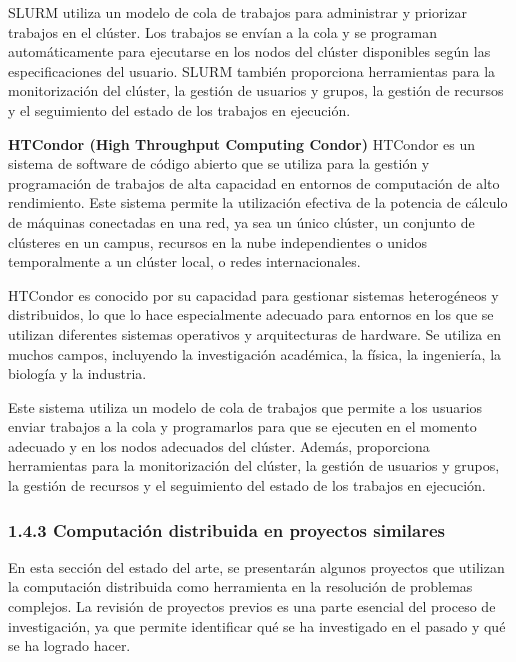 \begin{doublespace}
\begin{multicols}{2}
  SLURM utiliza un modelo de cola de trabajos para administrar y priorizar trabajos en el clúster. Los trabajos se envían a la cola y se programan automáticamente para ejecutarse en los nodos del clúster disponibles según las especificaciones del usuario. SLURM también proporciona herramientas para la monitorización del clúster, la gestión de usuarios y grupos, la gestión de recursos y el seguimiento del estado de los trabajos en ejecución.
  \vspace{3mm}

  \textbf{HTCondor (High Throughput Computing Condor)}
  \newline
  HTCondor es un sistema de software de código abierto que se utiliza para la gestión y programación de trabajos de alta capacidad en entornos de computación de alto rendimiento. Este sistema permite la utilización efectiva de la potencia de cálculo de máquinas conectadas en una red, ya sea un único clúster, un conjunto de clústeres en un campus, recursos en la nube independientes o unidos temporalmente a un clúster local, o redes internacionales.

  HTCondor es conocido por su capacidad para gestionar sistemas heterogéneos y distribuidos, lo que lo hace especialmente adecuado para entornos en los que se utilizan diferentes sistemas operativos y arquitecturas de hardware. Se utiliza en muchos campos, incluyendo la investigación académica, la física, la ingeniería, la biología y la industria.

  Este sistema utiliza un modelo de cola de trabajos que permite a los usuarios enviar trabajos a la cola y programarlos para que se ejecuten en el momento adecuado y en los nodos adecuados del clúster. Además, proporciona herramientas para la monitorización del clúster, la gestión de usuarios y grupos, la gestión de recursos y el seguimiento del estado de los trabajos en ejecución.

  \subsubsection{1.4.3 Computación distribuida en proyectos similares}

  En esta sección del estado del arte, se presentarán algunos proyectos que utilizan la computación distribuida como herramienta en la resolución de problemas complejos. La revisión de proyectos previos es una parte esencial del proceso de investigación, ya que permite identificar qué se ha investigado en el pasado y qué se ha logrado hacer.


\end{multicols}
\end{doublespace}
